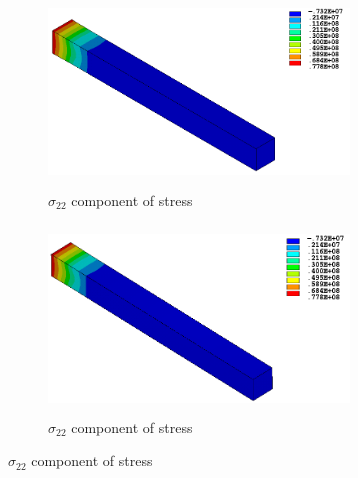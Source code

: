 \documentclass[12pt,a4paper,twoside,openright]{report}
\begin{document}
\begin{figure}[htbp!]\ContinuedFloat     
     \begin{subfigure}[b]{0.4\textwidth}
        \includegraphics[width=8cm,height=5cm]{16.Ansys_SY.png}
         \caption{ $\sigma_{22}$ component of stress }
         \label{fig:Y Component of Stress}
     \end{subfigure}
    \hspace{1.8cm}
      \begin{subfigure}[b]{0.4\textwidth}
         \includegraphics[width=8cm,height=5cm]{19.User_SY.png}
         \caption{ $\sigma_{22}$ component of stress}
         \label{fig:Y Component of Stress2}
     \end{subfigure}
\end{figure}
\FloatBarrier
\end{document}

